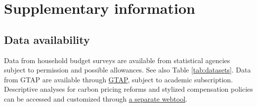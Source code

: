 \documentclass[12pt, a4paper]{article}
\begin{document}
\begin{refsection}


\clearpage


\clearpage


\clearpage


\clearpage


\clearpage


\clearpage


\clearpage


\clearpage


\clearpage


\clearpage


\clearpage


\clearpage


\clearpage

\begin{refcontext}[sorting=nyt]
\printbibliography[heading=subbibliography, title ={References (Appendix)}]
\end{refcontext}
\end{refsection}

\clearpage

\section{Supplementary information}

\subsection{Data availability} \label{data_availability} Data from household budget surveys are available from statistical agencies subject to permission and possible allowances. See also Table \ref{tab:datasets}. Data from GTAP are available through \href{https://www.gtap.agecon.purdue.edu/}{GTAP}, subject to academic subscription.
Descriptive analyses for carbon pricing reforms and stylized compensation policies can be accessed and customized through \href{https://www.cpic-global.net/}{a separate webtool}.
\end{document}
